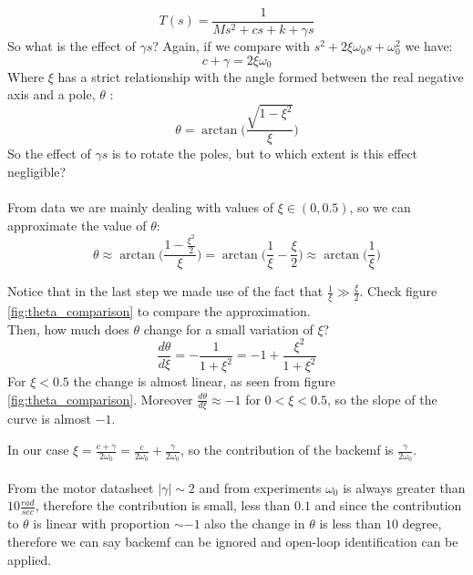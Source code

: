 \begin{equation}T(s) = \frac{1}{Ms^2+cs+k+\gamma s}\end{equation}
So what is the effect of $\gamma s$?
Again, if we compare with $s^2+2\xi \omega_0 s+ \omega_0^2$ we have:
\begin{equation}c+\gamma = 2\xi \omega_0\end{equation}
Where $\xi$ has a strict relationship with the angle formed between the real negative axis and a pole,  $\theta$ :
\begin{equation}\theta = \arctan \Big(\frac{\sqrt{1-\xi^2}}{\xi} \Big)\end{equation}
So the effect of $\gamma s$ is to rotate the poles, but to which extent is this effect negligible? \\ \\
From data we are mainly dealing with values of $\xi \in (0, 0.5)$, so we can approximate the value of $\theta$:
\begin{equation}\theta \approx \arctan \Big(\frac{1-\frac{\xi^2}{2}}{\xi} \Big) = \arctan \Big(\frac{1}{\xi}-\frac{\xi}{2} \Big) \approx \arctan \Big (\frac{1}{\xi} \Big)\end{equation}

Notice that in the last step we made use of the fact that $\frac{1}{\xi} \gg \frac{\xi}{2}$. Check figure \ref{fig:theta_comparison} to compare the approximation. \\ 
Then, how much does $\theta$ change for a small variation of $\xi$?
\begin{equation}\frac{d\theta}{d\xi} = -\frac{1}{1+\xi^2} = -1 + \frac{\xi^2}{1+\xi^2}\end{equation}
For $\xi < 0.5$ the change is almost linear, as seen from figure \ref{fig:theta_comparison}. Moreover $\frac{d\theta}{d\xi} \approx -1$ for $0 < \xi < 0.5$, so the slope of the curve is almost $-1$.

In our case $\xi = \frac{c+\gamma}{2\omega_0}= \frac{c}{2\omega_0}+ \frac{\gamma}{2\omega_0}$, so the contribution of the backemf is $\frac{\gamma}{2\omega_0}$. \\ \\
From the motor datasheet $| \gamma | \sim 2$ and from experiments $\omega_0$ is always greater than $10 \frac{rad}{sec}$, therefore the contribution is small, less than $0.1$ and since the contribution to $\theta$ is linear with proportion $\sim -1$ also the change in $\theta$ is less than $10$ degree, therefore we can say backemf can be ignored and open-loop identification can be applied.


